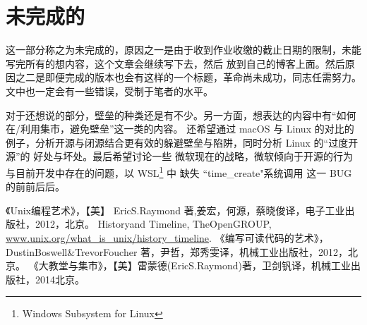 \documentclass{ctexart}
\begin{document}
    \section{未完成的}
    这一部分称之为未完成的，原因之一是由于收到作业收缴的截止日期的限制，未能写完所有的想内容，这个文章会继续写下去，然后
    放到自己的博客上面。然后原因之二是即便完成的版本也会有这样的一个标题，革命尚未成功，同志任需努力。
    文中也一定会有一些错误，受制于笔者的水平。
    
    对于还想说的部分，壁垒的种类还是有不少。另一方面，想表达的内容中有“如何在/利用集市，避免壁垒”这一类的内容。
    还希望通过 macOS 与 Linux 的对比的例子，分析开源与闭源结合更有效的躲避壁垒与陷阱，同时分析 Linux 的“过度开源”的
    好处与坏处。最后希望讨论一些 微软现在的战略，微软倾向于开源的行为与目前开发中存在的问题，以 WSL\footnote{Windows Subsystem for Linux} 中 缺失 “time\_create"系统调用 这一 BUG 的前前后后。
    
    
    
    
    

    \begin{thebibliography}{0}
        《Unix编程艺术》，【美】 Eric\space S.\space Raymond 著,姜宏，何源，蔡晓俊\space 译，电子工业出版社，2012，北京。
         History\space and \space Timeline, The\space Open\space GROUP,
          \href{http://www.unix.org/what_is_unix/history_timeline.html}{www.unix.org/what\_is\_unix/history\_timeline}.
         《编写可读代码的艺术》，Dustin\space Boswell\&Trevor\space Foucher 著，尹哲，郑秀雯\space 译，机械工业出版社，2012，北京。
         《大教堂与集市》，【美】雷蒙德(Eric\space S.\space Raymond)著，卫剑钒\space 译，机械工业出版社，2014北京。
    \end{thebibliography}
        
\end{document}
